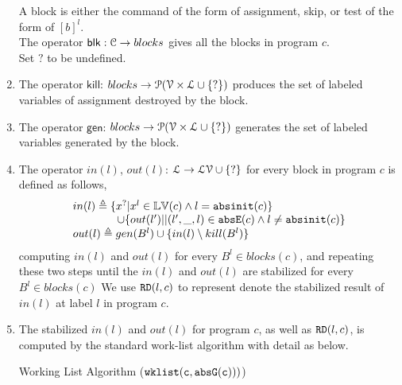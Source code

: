 \begin{enumerate}
A block is either the command of the form of assignment, skip, or test of the form of $[b]^{l}$.\\
The operator $\mathsf{blk}: \mathcal{C} \to blocks$ gives all the blocks in program $c$.
\\
 Set $?$ to be undefined.
\item The operator $\mathsf{kill}$: $blocks \to \mathcal{P}(\mathcal{V} \times \mathcal{L} \cup \{?\})$ produces the set of labeled variables of assignment destroyed by the block.
\item The operator $\mathsf{gen}$: $blocks \to \mathcal{P}(\mathcal{V} \times \mathcal{L} \cup \{?\})$ generates the set of labeled variables generated by the block.
\item The operator $in(l)$, $out(l)$: $ \mathcal{L} \to \mathcal{LV} \cup \{?\}$ for every block in program $c$ is defined as follows,
 \[
 \begin{array}{ll}
 in(l) \triangleq \{ x^{?} | x^l \in \mathbb{LV}(c) \land l = \mathtt{abs}{\mathtt{init}}(c) \} 
 \\ \qquad \qquad \cup \{ out(l')| | (l',\_, l) \in \mathtt{abs}{\mathtt{E}}(c) \land l \neq \mathtt{abs}{\mathtt{init}}(c)\} \\
 out(l) \triangleq gen(B^{l}) \cup \{ in(l) \setminus kill(B^l) \} 
 \end{array}
 \]
computing $in(l)$ and $out(l)$ for every $B^l \in blocks(c) $, and repeating these two steps
until the $in(l)$ and $out(l)$ are stabilized for every $B^l \in blocks(c) $
We use $\mathtt{RD}(l,c)$ to represent 
denote the stabilized result of $in(l)$ at label $l$ in program $c$. 
%
\item The stabilized $in(l)$ and $out(l)$ for program $c$, as well as $\mathtt{RD}(l, c)$,
is computed by the standard work-list algorithm with detail as below. 
\begin{algorithm}
 \caption{
 {Working List Algorithm ({$\mathtt{wklist(c, \mathtt{abs}{\mathtt{G}}(c)))}$})}
 \label{alg:adapt}
 }
 \begin{algorithmic}[1]

\end{algorithmic}
\end{algorithm}
\end{enumerate}
